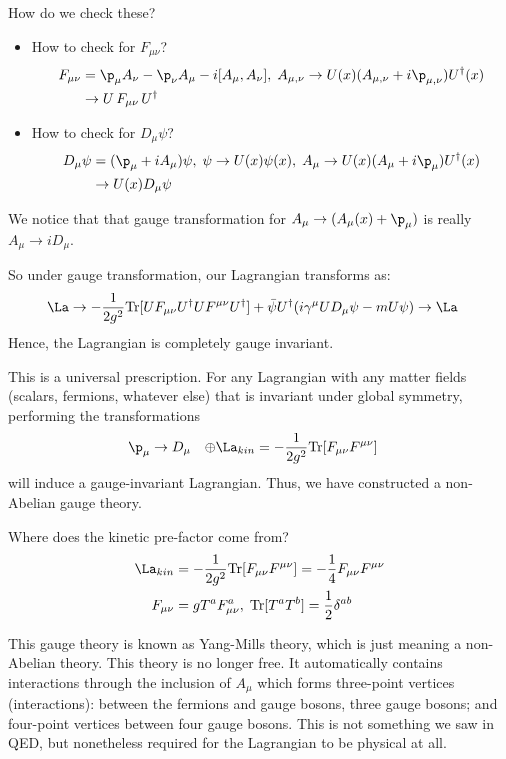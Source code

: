 \documentclass[relqm.tex]{subfiles}
\begin{document}
How do we check these?
\begin{itemize}
    \item How to check for $F_{\mu\nu}$?
        \begin{align}
            F_{\mu\nu} &= \p_\mu A_\nu - \p_\nu A_\mu - i[A_\mu,A_\nu],\; A_{\mu,\nu} \to U(x)(A_{\mu,\nu} + i\p_{\mu,\nu})U^\dagger(x) \\
                       &\to U\,F_{\mu\nu}\,U^\dagger
        \end{align}
    \item How to check for $D_\mu\psi$?
        \begin{align}
            D_\mu\psi &= (\p_\mu + iA_\mu)\psi,\; \psi \to U(x)\psi(x),\; A_\mu \to U(x)(A_\mu+i\p_\mu)U^\dagger(x) \\
                      &\to U(x)D_\mu\psi
        \end{align}
\end{itemize}
We notice that that gauge transformation for $A_\mu \to (A_\mu(x)+\p_\mu)$ is really $A_\mu \to iD_\mu$.

So under gauge transformation, our Lagrangian transforms as:
\begin{align}
    \La &\to -\frac{1}{2g^2}\text{Tr}[UF_{\mu\nu}U^\dagger UF^{\mu\nu}U^\dagger] + \bar{\psi}U^\dagger(i\gamma^\mu UD_\mu\psi - mU\psi) \to \La
\end{align}
Hence, the Lagrangian is completely gauge invariant.

This is a universal prescription. 
For any Lagrangian with any matter fields (scalars, fermions, whatever else) that is invariant under global symmetry, performing the transformations
\begin{align}
    \p_\mu &\to D_\mu & \oplus \La_{kin} &= -\frac{1}{2g^2}\text{Tr}[F_{\mu\nu}F^{\mu\nu}]
\end{align}
will induce a gauge-invariant Lagrangian. 
Thus, we have constructed a non-Abelian gauge theory. 

Where does the kinetic pre-factor come from?
\begin{align}
    \La_{kin} &= -\frac{1}{2g^2}\text{Tr}[F_{\mu\nu}F^{\mu\nu}] = -\frac14F_{\mu\nu}F^{\mu\nu} \\
    F_{\mu\nu} &= gT^aF_{\mu\nu}^a,\; \text{Tr}[T^aT^b] = \frac12\delta^{ab}
\end{align}

This gauge theory is known as Yang-Mills theory, which is just meaning a non-Abelian theory. 
This theory is no longer free. 
It automatically contains interactions through the inclusion of $A_\mu$ which forms three-point vertices (interactions): between the fermions and gauge bosons, three gauge bosons; and four-point vertices between four gauge bosons.
This is not something we saw in QED, but nonetheless required for the Lagrangian to be physical at all. 
\end{document}
